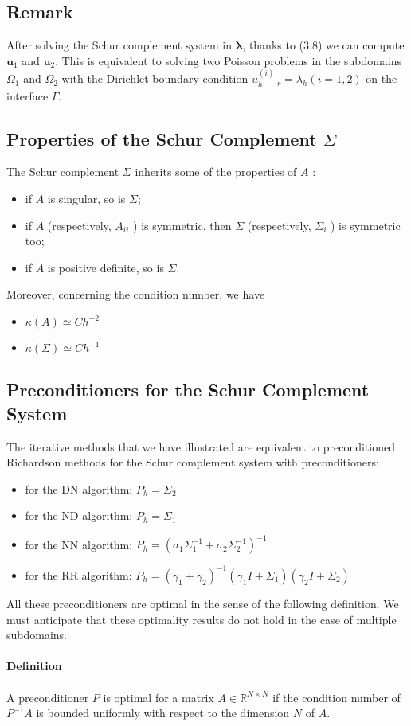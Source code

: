 \documentclass[11pt]{book}
\begin{document}
\subsection*{Remark}
After solving the Schur complement system in $\boldsymbol{\lambda}$, thanks to (3.8) we can compute $\mathbf{u}_{1}$ and $\mathbf{u}_{2}$.
This is equivalent to solving two Poisson problems in the subdomains $\Omega_{1}$ and $\Omega_{2}$ with the Dirichlet boundary condition $u_{h}^{(i)}{ }_{\mid r}=\lambda_{h}(i=1,2)$ on the interface $\Gamma$.

\subsection*{Properties of the Schur Complement $\Sigma$}
The Schur complement $\Sigma$ inherits some of the properties of $A$ :
\begin{itemize}
  \item if $A$ is singular, so is $\Sigma$;
  \item if $A$ (respectively, $A_{i i}$ ) is symmetric, then $\Sigma$ (respectively, $\Sigma_{i}$ ) is symmetric too;
  \item if $A$ is positive definite, so is $\Sigma$.
\end{itemize}

Moreover, concerning the condition number, we have
\begin{itemize}
  \item $\kappa(A) \simeq C h^{-2}$
  \item $\kappa(\Sigma) \simeq C h^{-1}$
\end{itemize}

\subsection*{Preconditioners for the Schur Complement System}
The iterative methods that we have illustrated are equivalent to preconditioned Richardson methods for the Schur complement system with preconditioners:

\begin{itemize}
\item for the DN algorithm: $P_h=\Sigma_2$
\item for the ND algorithm: $P_h=\Sigma_1$
\item for the NN algorithm: $P_h=\left(\sigma_1 \Sigma_1^{-1}+\sigma_2 \Sigma_2^{-1}\right)^{-1}$
\item for the RR algorithm: $P_h=\left(\gamma_1+\gamma_2\right)^{-1}\left(\gamma_1 I+\Sigma_1\right)\left(\gamma_2 I+\Sigma_2\right)$
\end{itemize}
All these preconditioners are optimal in the sense of the following definition. We must anticipate that these optimality results do not hold in the case of multiple subdomains.
\\ \\
\textbf{Definition} \\ \\
A preconditioner $P$ is optimal for a matrix $A \in \mathbb{R}^{N \times N}$ if the condition number of $P^{-1} A$ is bounded uniformly with respect to the dimension $N$ of $A$.
\end{document}
